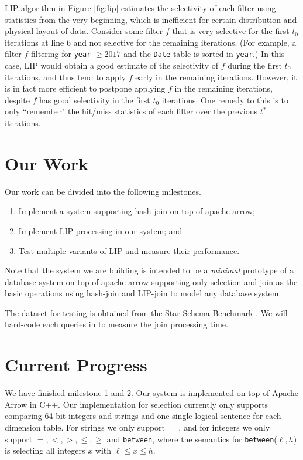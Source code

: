 \documentclass[10pt]{article}
\begin{document}
LIP algorithm in Figure \ref{fig:lip} estimates the selectivity of each filter using statistics from the very beginning, which is inefficient for certain distribution and physical layout of data. Consider some filter $f$ that is very selective for the first $t_0$ iterations at line 6 and not selective for the remaining iterations. (For example, a filter $f$ filtering for \texttt{year} $\geq 2017$ and the \texttt{Date} table is sorted in \texttt{year}.) In this case, LIP would obtain a good estimate of the selectivity of $f$ during the first $t_0$ iterations, and thus tend to apply $f$ early in the remaining iterations. However, it is in fact more efficient to postpone applying $f$ in the remaining iterations, despite $f$ has good selectivity in the first $t_0$ iterations. One remedy to this is to only ``remember" the hit/miss statistics of each filter over the previous $t^*$ iterations.


\section{Our Work}

Our work can be divided into the following milestones.

\begin{enumerate}
	\item Implement a system supporting hash-join on top of apache arrow;
	\item Implement LIP processing in our system; and
	\item Test multiple variants of LIP and measure their performance.
\end{enumerate}


Note that the system we are building is intended to be a \textit{minimal} prototype of a database system on top of apache arrow supporting only selection and join as the basic operations using hash-join and LIP-join to model any database system. 

The dataset for testing is obtained from the Star Schema Benchmark \cite{o2009star}. We will hard-code each queries in \cite{o2009star} to measure the join processing time.

\section{Current Progress}

We have finished milestone 1 and 2. Our system is implemented on top of Apache Arrow in C++. Our implementation for selection currently only supports comparing 64-bit integers and strings and one single logical sentence for each dimension table. For strings we only support $=$, and for integers we only support $=, <, >, \leq, \geq$ and \texttt{between}, where the semantics for \texttt{between}($\ell, h$) is selecting all integers $x$ with $\ell \leq x \leq h$. 
\end{document}
